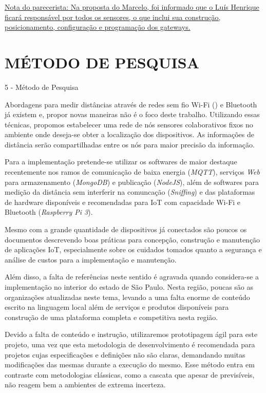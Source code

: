 \documentclass[
	12pt,				%
	openright,			%
	oneside,			%
	a4paper,			%
	chapter=TITLE,		%
	english,			%
	french,				%
	spanish,			%
	brazil				%
	]{abntex2}
\begin{document}
{\begin{alineas}
\end{alineas}

\underline{Nota do parecerista: Na proposta do Marcelo, foi informado que o Luís
Henrique ficará responsável por todos os sensores, o que inclui sua construção,
posicionamento, configuração e programação dos gateways.}


\chapter{MÉTODO DE PESQUISA}
\label{chap:MÉTODO DE PESQUISA}

 5 - Método de Pesquisa

Abordagens para medir distâncias através de redes sem fio Wi-Fi
(\cite{bahillo2009ieee}) e Bluetooth já existem e, propor novas maneiras não é o foco
deste trabalho. Utilizando essas técnicas, propomos estabelecer uma rede de nós
sensores colaborativos fixos no ambiente onde deseja-se obter a localização dos
dispositivos. As informações de distância serão compartilhadas entre os nós para
maior precisão da informação.

Para a implementação pretende-se utilizar os softwares de maior destaque
recentemente nos ramos de comunicação de baixa energia (\textit{MQTT}), serviços \textit{Web}
para armazenamento (\textit{MongoDB}) e publicação (\textit{NodeJS}), além de softwares para
medição da distância sem interferir na comuncação (\textit{Sniffing}) e das plataformas
de hardware disponíveis e recomendadas para IoT com capacidade Wi-Fi e Bluetooth
(\textit{Raspberry Pi 3}).

Mesmo com a grande quantidade de dispositivos já conectados são poucos os
documentos descrevendo boas práticas para concepção, construção e manutenção de
aplicações IoT, especialmente sobre os cuidados tomados quanto a segurança e
análise de custos para a implementação e manutenção.

Além disso, a falta de referências neste sentido é agravada quando considera-se
a implementação no interior do estado de São Paulo. Nesta região, poucas são as
organizações atualizadas neste tema, levando a uma falta enorme de conteúdo
escrito na linguagem local além de serviços e produtos disponíveis para
construção de uma plataforma completa e competitiva nesta região.

Devido a falta de conteúdo e instrução, utilizaremos prototipagem ágil para este
projeto, uma vez que esta metodologia de desenvolvimento é recomendada para
projetos cujas especificações e definições não são claras, demandando muitas
modificações das mesmas durante a execução do mesmo. Esse método entra em
contraste com metodologias clássicas, como a cascata que apesar de previsíveis,
não reagem bem a ambientes de extrema incerteza.

}
\end{document}
